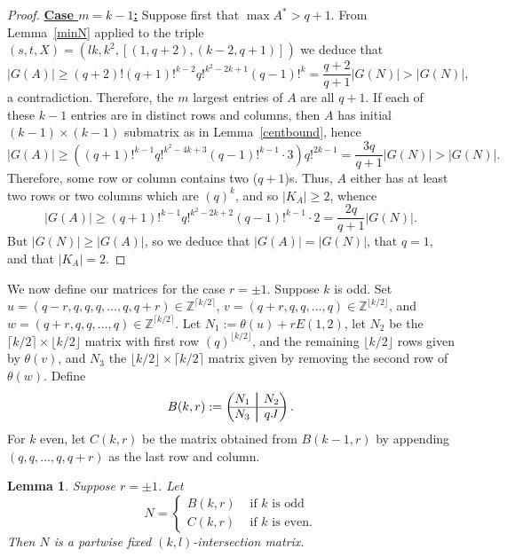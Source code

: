 \documentclass{daj}
\newcommand\aug{\fboxsep=-\fboxrule\!\!\!\fbox{\strut}\!\!\!}
\newcommand\Z{\mathbb{Z}}
\theoremstyle{plain}
\newtheorem{lemma}[theorem]{Lemma}
\theoremstyle{definition}
\begin{document}
\begin{proof}
\vspace{11pt}\noindent \textbf{\underline{Case $m=k-1$:}} Suppose first that $\max A^*>q+1$. From Lemma~\ref{minN} applied to the triple $(s,t,X)=(lk,k^2,[(1,q+2),(k-2,q+1)])$ we deduce that $$|G(A)|\geq (q+2)!(q+1)!^{k-2}q!^{k^2-2k+1}(q-1)!^{k}=\frac{q+2}{q+1}|G(N)|>|G(N)|,$$ a contradiction. Therefore, the $m$ largest entries of $A$ are all $q+1$. If each of these $k-1$ entries are in distinct rows and columns, then $A$ has initial $(k-1)\times (k-1)$ submatrix as in Lemma~\ref{centbound}, hence  $$|G(A)|\geq ((q+1)!^{k-1}q!^{k^2-4k+3}(q-1)!^{k-1}\cdot 3)q!^{2k-1}=\frac{3q}{q+1}|G(N)|> |G(N)|.$$
Therefore, some row or column contains two ($q+1$)s. Thus, $A$ either has at least two rows or two columns which are $(q)^k$, and so $|K_A|\geq 2$, whence $$|G(A)|\geq (q+1)!^{k-1}q!^{k^2-2k+2}(q-1)!^{k-1}\cdot2=\frac{2q}{q+1}|G(N)|.$$ 
But $|G(N)|\geq |G(A)|$, so we deduce that $|G(A)|=|G(N)|$, that $q=1$, and that $|K_A|=2$.
\end{proof}
We now define our matrices for the case $r=\pm1$.
Suppose $k$ is odd. Set $u=(q-r,q,q,q,\dots,q,q+r)\in\Z^{\lceil k/2\rceil}$, $v=(q+r,q,q,\dots,q)\in\Z^{\lfloor k/2\rfloor}$, and $w=(q+r,q,q,\dots,q)\in\Z^{\lceil k/2\rceil}$. Let $N_1:=\theta(u)+r E(1,2)$, let $N_2$ be the $\lceil k/2\rceil\times \lfloor k/2\rfloor$ matrix with first row $(q)^{\lfloor k/2\rfloor}$, and the remaining $\lfloor k/2\rfloor$ rows given by $\theta(v)$, and $N_3$ the $\lfloor k/2\rfloor\times\lceil k/2\rceil$ matrix given by removing the second row of $\theta(w)$. Define $$B(k,r):=\begin{pmatrix} N_1&\aug& N_2\\ \hline N_3&\aug& qJ\\\end{pmatrix}.$$ For $k$ even, let $C(k,r)$ be the matrix obtained from $B(k-1,r)$ by appending $(q,q,\dots,q,q+r)$ as the last row and column.
\begin{lemma}\label{bestmat1}
Suppose $r=\pm 1$. Let $$N=\begin{cases} B(k,r)&\text{ if $k$ is odd}\\C(k,r)&\text{ if $k$ is even.}\end{cases}$$ Then $N$ is a partwise fixed $(k,l)$-intersection matrix.
\end{lemma}
\end{document}

